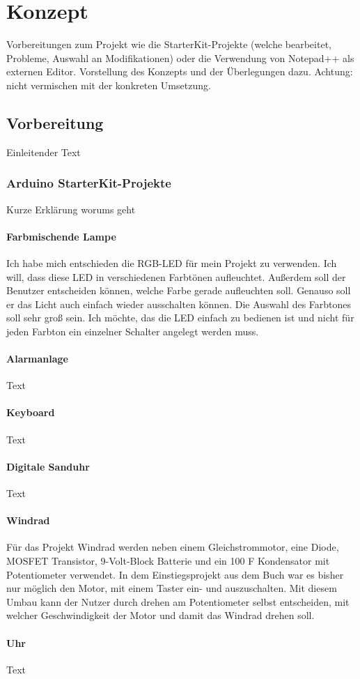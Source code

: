 \chapter{Konzept}

Vorbereitungen zum Projekt wie die StarterKit-Projekte (welche bearbeitet, Probleme, Auswahl an Modifikationen) oder die Verwendung von Notepad++ als externen Editor. Vorstellung des Konzepts und der Überlegungen dazu. Achtung: nicht vermischen mit der konkreten Umsetzung.

\section{Vorbereitung}
Einleitender Text
\subsection{Arduino StarterKit-Projekte}
Kurze Erklärung worums geht

\subsubsection{Farbmischende Lampe}
Ich habe mich entschieden die RGB-LED für mein Projekt zu verwenden. Ich will, dass diese LED in verschiedenen Farbtönen aufleuchtet. Außerdem soll der Benutzer entscheiden können, welche Farbe gerade aufleuchten soll. Genauso soll er das Licht auch einfach wieder ausschalten können. Die Auswahl des Farbtones soll sehr groß sein. Ich möchte, das die LED einfach zu bedienen ist und nicht für jeden Farbton ein einzelner Schalter angelegt werden muss.

\subsubsection{Alarmanlage}
Text

\subsubsection{Keyboard}
Text

\subsubsection{Digitale Sanduhr}
Text

\subsubsection{Windrad}
Für das Projekt Windrad werden neben einem Gleichstrommotor, eine Diode, MOSFET Transistor, 9-Volt-Block Batterie und ein 100 \mu F Kondensator mit Potentiometer verwendet. In dem Einstiegsprojekt aus dem Buch war es bisher nur möglich den Motor, mit einem Taster ein- und auszuschalten. Mit diesem Umbau kann der Nutzer durch drehen am Potentiometer selbst entscheiden, mit welcher Geschwindigkeit der Motor und damit das Windrad drehen soll.

\subsubsection{Uhr}
Text